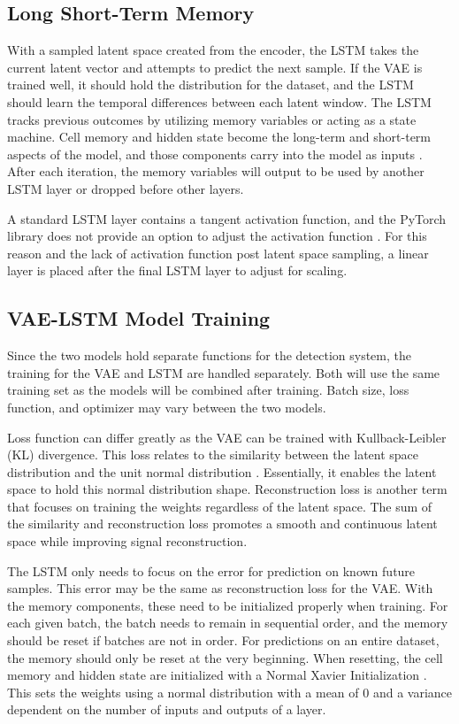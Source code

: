 \documentclass[conference]{IEEEtran}
\begin{document}
\subsection{Long Short-Term Memory}
With a sampled latent space created from the encoder, the LSTM takes the current latent vector and attempts to predict the next sample. If the VAE is trained well, it should hold the distribution for the dataset, and the LSTM should learn the temporal differences between each latent window. The LSTM tracks previous outcomes by utilizing memory variables or acting as a state machine. Cell memory and hidden state become the long-term and short-term aspects of the model, and those components carry into the model as inputs \cite{lstm_page}. After each iteration, the memory variables will output to be used by another LSTM layer or dropped before other layers.

A standard LSTM layer contains a tangent activation function, and the PyTorch library does not provide an option to adjust the activation function \cite{lstm_pytorch}. For this reason and the lack of activation function post latent space sampling, a linear layer is placed after the final LSTM layer to adjust for scaling.

\subsection{VAE-LSTM Model Training}
Since the two models hold separate functions for the detection system, the training for the VAE and LSTM are handled separately. Both will use the same training set as the models will be combined after training. Batch size, loss function, and optimizer may vary between the two models.

Loss function can differ greatly as the VAE can be trained with Kullback-Leibler (KL) divergence. This loss relates to the similarity between the latent space distribution and the unit normal distribution \cite{vae_page}. Essentially, it enables the latent space to hold this normal distribution shape. Reconstruction loss is another term that focuses on training the weights regardless of the latent space. The sum of the similarity and reconstruction loss promotes a smooth and continuous latent space while improving signal reconstruction.

The LSTM only needs to focus on the error for prediction on known future samples. This error may be the same as reconstruction loss for the VAE. With the memory components, these need to be initialized properly when training. For each given batch, the batch needs to remain in sequential order, and the memory should be reset if batches are not in order. For predictions on an entire dataset, the memory should only be reset at the very beginning. When resetting, the cell memory and hidden state are initialized with a Normal Xavier Initialization \cite{xavier}. This sets the weights using a normal distribution with a mean of 0 and a variance dependent on the number of inputs and outputs of a layer.
\end{document}
